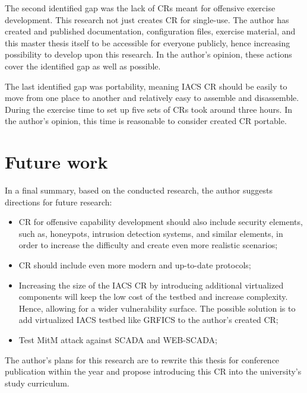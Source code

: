 The second identified gap was the lack of CRs meant for offensive exercise development.  This research not just creates CR for single-use. The author has created and published documentation, configuration files,  exercise material, and this master thesis itself to be accessible for everyone publicly, hence increasing possibility to develop upon this research. In the author's opinion, these actions cover the identified gap as well as possible.


The last identified gap was portability, meaning IACS CR should be easily to move from one place to another and relatively easy to assemble and disassemble. During the exercise time to set up five sets of CRs took around three hours. In the author's opinion, this time is reasonable to consider created CR portable.


\section{Future work}

In a final summary, based on the conducted research, the author suggests directions for future research:

\begin{itemize}
	\item CR for offensive capability development should also include security elements, such as, honeypots, intrusion detection systems, and similar elements, in order to increase the difficulty and create even more realistic scenarios;
	
	\item CR should include even more modern and up-to-date protocols;
	
	\item Increasing the size of the IACS CR by introducing additional virtualized components will keep the low cost of the testbed and increase complexity. Hence, allowing for a wider vulnerability surface. The possible solution is to add virtualized IACS testbed like GRFICS \parencite{39-grfics-scada-simulator} to the author's created CR;
	
	\item Test MitM attack against SCADA and WEB-SCADA;
\end{itemize}

The author's plans for this research are to rewrite this thesis for conference publication within the year and propose introducing this CR into the university's study curriculum.